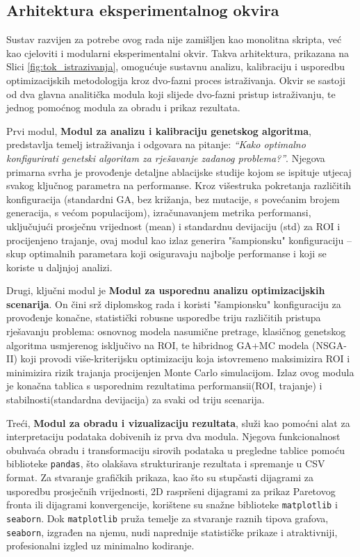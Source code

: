 \subsection{Arhitektura eksperimentalnog okvira}

Sustav razvijen za potrebe ovog rada nije zamišljen kao monolitna skripta, već kao cjeloviti i modularni eksperimentalni okvir. Takva arhitektura, prikazana na Slici \ref{fig:tok_istrazivanja}, omogućuje sustavnu analizu, kalibraciju i usporedbu optimizacijskih metodologija kroz dvo-fazni proces istraživanja. Okvir se sastoji od dva glavna analitička modula koji slijede dvo-fazni pristup istraživanju, te jednog pomoćnog modula za obradu i prikaz rezultata.

Prvi modul, \textbf{Modul za analizu i kalibraciju genetskog algoritma}, predstavlja temelj istraživanja i odgovara na pitanje: \emph{``Kako optimalno konfigurirati genetski algoritam za rješavanje zadanog problema?''}. Njegova primarna svrha je provođenje detaljne ablacijske studije kojom se ispituje utjecaj svakog ključnog parametra na performanse. Kroz višestruka pokretanja različitih konfiguracija (standardni GA, bez križanja, bez mutacije, s povećanim brojem generacija, s većom populacijom), izračunavanjem metrika performansi, uključujući prosječnu vrijednost (mean) i standardnu devijaciju (std) za ROI i procijenjeno trajanje, ovaj modul kao izlaz generira "šampionsku" konfiguraciju – skup optimalnih parametara koji osiguravaju najbolje performanse i koji se koriste u daljnjoj analizi.

    Drugi, ključni modul je \textbf{Modul za usporednu analizu optimizacijskih scenarija}. On čini srž diplomskog rada i koristi "šampionsku" konfiguraciju za provođenje konačne, statistički robusne usporedbe triju različitih pristupa rješavanju problema: osnovnog modela nasumične pretrage, klasičnog genetskog algoritma usmjerenog isključivo na ROI, te hibridnog GA+MC modela (NSGA-II) koji provodi više-kriterijsku optimizaciju koja istovremeno maksimizira ROI i minimizira rizik trajanja procijenjen Monte Carlo simulacijom.  Izlaz ovog modula je konačna tablica s usporednim rezultatima performansii(ROI, trajanje) i stabilnosti(standardna devijacija) za svaki od triju scenarija.

    Treći, \textbf{Modul za obradu i vizualizaciju rezultata}, služi kao pomoćni alat za interpretaciju podataka dobivenih iz prva dva modula. Njegova funkcionalnost obuhvaća obradu i transformaciju sirovih podataka u pregledne tablice pomoću biblioteke \texttt{pandas}, što olakšava strukturiranje rezultata i spremanje u CSV format. Za stvaranje grafičkih prikaza, kao što su stupčasti dijagrami za usporedbu prosječnih vrijednosti, 2D raspršeni dijagrami za prikaz Paretovog fronta ili dijagrami konvergencije, korištene su snažne biblioteke \texttt{matplotlib} i \texttt{seaborn}. Dok \texttt{matplotlib} pruža temelje za stvaranje raznih tipova grafova, \texttt{seaborn}, izgrađen na njemu, nudi naprednije statističke prikaze i atraktivniji, profesionalni izgled uz minimalno kodiranje.

